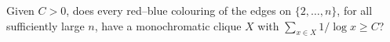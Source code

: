 Given $C>0$, does every red--blue colouring of the edges on $\{2,\ldots,n\}$, for all sufficiently large $n$, have a monochromatic clique $X$ with $\sum_{x\in X}1/\log x\ge C$?
